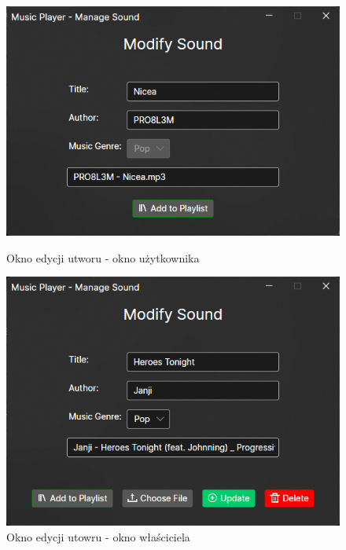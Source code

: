 \newpage

\begin{figure}[h!]
  \centering
  \begin{minipage}{.53\textwidth}
    \centering
    \includegraphics[width=.9\linewidth]{figures/modify1.png}
    \caption{{\footnotesize Okno edycji utworu - okno użytkownika}}
  \end{minipage}%
  \begin{minipage}{.55\textwidth}
    \centering
    \includegraphics[width=.9\linewidth]{figures/modify2.png}
    \caption{{\footnotesize Okno edycji utowru - okno właściciela}}
  \end{minipage}
\end{figure}

